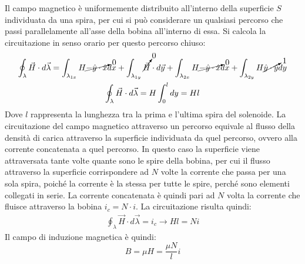 \documentclass{article}
\numberwithin{equation}{subsection}
\begin{document}
\begin{center}
\end{center}

Il campo magnetico è uniformemente distribuito all'interno della superficie $S$ individuata da una spira, per cui si può considerare un qualsiasi percorso che passi parallelamente 
all'asse della bobina all'interno di essa. Si calcola la circuitazione in senso orario per questo percorso chiuso:
\begin{gather*}
    \displaystyle\oint_{\lambda}\vec{H}\cdot d\vec{\lambda}=\int_{\lambda_{1x}}H\cancelto{0}{-\hat{y}\cdot\hat{x}}dx+\int_{\lambda_{1y}}\cancelto{0}{\vec{H}}\cdot d\vec{y}+\int_{\lambda_{2x}}H\cancelto{0}{-\hat{y}\cdot\hat{x}}dx+\int_{\lambda_{2y}}H\cancelto{1}{\hat{y}\cdot\hat{y}}dy\\
    \displaystyle\oint_{\lambda}\vec{H}\cdot d\vec{\lambda}=H\int_0^ldy=Hl
\end{gather*}
Dove $l$ rappresenta la lunghezza tra la prima e l'ultima spira del solenoide. La circuitazione del campo magnetico attraverso un percorso equivale al 
flusso della densità di carica attraverso la superficie individuata da quel percorso, ovvero alla corrente concatenata a quel percorso. In questo caso la superficie 
viene attraversata tante volte quante sono le spire della bobina, per cui il flusso attraverso la superficie corrispondere ad $N$ volte la corrente che passa per una sola spira, 
poiché la corrente è la stessa per tutte le spire, perché sono elementi collegati in serie. La corrente concatenata è quindi pari ad $N$ volta la corrente che fluisce 
attraverso la bobina $i_c=N\cdot i$. La circuitazione risulta quindi:
\begin{gather*}
    \displaystyle\oint_{\lambda}\vec{H}\cdot d\vec{\lambda}=i_c\to Hl=Ni
\end{gather*}
Il campo di induzione magnetica è quindi:
\begin{equation*}
    B=\mu H=\displaystyle\frac{\mu N}{l}i
\end{equation*}
\end{document}
